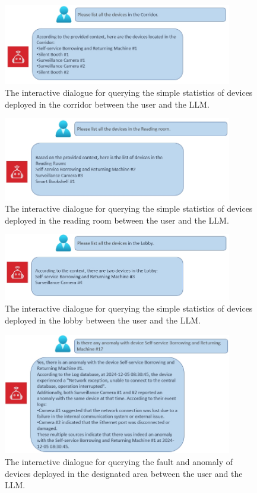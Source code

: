 \documentclass[preprint,12pt]{elsarticle}
\begin{document}
\begin{figure}[!h]
	\centering
	\includegraphics[width=10cm]{case1_1.png}
	\caption{The interactive dialogue for querying the simple statistics of devices deployed in the corridor between the user and the LLM.}
	\label{case1_1}
\end{figure}

\begin{figure}[!h]
	\centering
	\includegraphics[width=10cm]{case1_2.png}
	\caption{The interactive dialogue for querying the simple statistics of devices deployed in the reading room between the user and the LLM.}
	\label{case1_2}
\end{figure}


\begin{figure}[!h]
	\centering
	\includegraphics[width=10cm]{case1_3.png}
	\caption{The interactive dialogue for querying the simple statistics of devices deployed in the lobby between the user and the LLM.}
	\label{case1_3}
\end{figure}

\begin{figure}[!h]
	\centering
	\includegraphics[width=10cm]{case2.png}
	\caption{The interactive dialogue for querying the fault and anomaly of devices deployed in the designated area between the user and the LLM.}
	\label{case2}
\end{figure}
\end{document}

